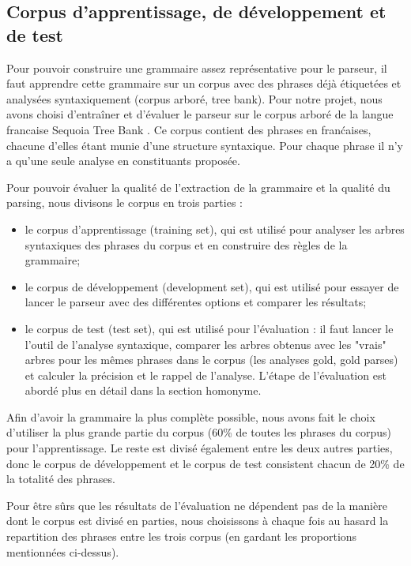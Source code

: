 \documentclass[12pt]{article}
\begin{document}
\subsection{Corpus d'apprentissage, de d\'eveloppement et de test}
Pour pouvoir construire une grammaire assez repr\'esentative pour le parseur, il
faut apprendre cette grammaire sur un corpus avec des phrases d\'ej\`a
\'etiquet\'ees et analys\'ees syntaxiquement (corpus arbor\'e, tree bank). Pour notre projet, nous
avons choisi d'entra\^iner et d'\'evaluer le parseur sur le corpus arbor\'e de la
langue francaise Sequoia Tree Bank \cite{Sequoia}. Ce corpus contient des
phrases en fran\'caises, chacune d'elles \'etant munie d'une structure syntaxique. 
Pour chaque phrase il n'y a qu'une seule analyse en constituants propos\'ee.\par

Pour pouvoir \'evaluer la qualit\'e de l'extraction de la grammaire et la qualit\'e du
parsing, nous divisons le corpus en trois parties :
\begin{itemize}
  \item le corpus d'apprentissage (training set), qui est utilis\'e pour analyser
  les arbres syntaxiques des phrases du corpus et en construire des r\`egles de la
  grammaire;
  \item le corpus de d\'eveloppement (development set), qui est utilis\'e pour
  essayer de lancer le parseur avec des diff\'erentes options et comparer les
  r\'esultats;
  \item le corpus de test (test set), qui est utilis\'e pour l'\'evaluation :
  il faut lancer le l'outil de l'analyse syntaxique, comparer les arbres obtenus avec les "vrais" arbres
  pour les m\^emes phrases dans le corpus (les analyses gold, gold parses) et
  calculer la pr\'ecision et le rappel de l'analyse. 
  L'\'etape de l'\'evaluation est abord\'e plus en d\'etail dans la section homonyme.
\end{itemize}

Afin d'avoir la grammaire la plus compl\`ete possible, nous avons fait le choix
d'utiliser la plus grande partie du corpus (60\% de toutes les phrases du
corpus) pour l'apprentissage. Le reste est divis\'e \'egalement entre les deux
autres parties, donc le corpus de d\'eveloppement et le corpus de test consistent
chacun de 20\% de la totalit\'e des phrases. \par

Pour \^etre s\^urs que les r\'esultats de l'\'evaluation ne d\'ependent pas de la mani\`ere
dont le corpus est divis\'e en parties, nous choisissons \`a chaque fois au hasard
la repartition des phrases entre les trois corpus (en gardant les proportions mentionn\'ees
ci-dessus).
\end{document}
